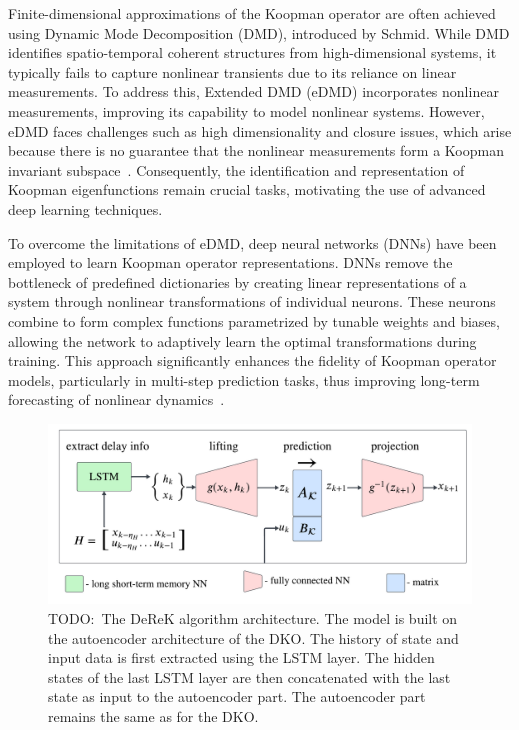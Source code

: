 \documentclass[conference]{IEEEtran}
\newcommand{\todo}[1]{{{\color{red} TODO:~#1	}} }
\begin{document}
Finite-dimensional approximations of the Koopman operator are often achieved using Dynamic Mode Decomposition (DMD), introduced by Schmid. While DMD identifies spatio-temporal coherent structures from high-dimensional systems, it typically fails to capture nonlinear transients due to its reliance on linear measurements. To address this, Extended DMD (eDMD) incorporates nonlinear measurements, improving its capability to model nonlinear systems. However, eDMD faces challenges such as high dimensionality and closure issues, which arise because there is no guarantee that the nonlinear measurements form a Koopman invariant subspace~\cite{Lusch2018}. Consequently, the identification and representation of Koopman eigenfunctions remain crucial tasks, motivating the use of advanced deep learning techniques.

To overcome the limitations of eDMD, deep neural networks (DNNs) have been employed to learn Koopman operator representations. DNNs remove the bottleneck of predefined dictionaries by creating linear representations of a system through nonlinear transformations of individual neurons. These neurons combine to form complex functions parametrized by tunable weights and biases, allowing the network to adaptively learn the optimal transformations during training. This approach significantly enhances the fidelity of Koopman operator models, particularly in multi-step prediction tasks, thus improving long-term forecasting of nonlinear dynamics~\cite{Yeung2019}.
\begin{figure}\label{fig:derek_scheme}
    \centerline{\includegraphics[width = \linewidth]{figures/derek_scheme.pdf}}
    \caption{\todo{The DeReK algorithm architecture. The model is built on the autoencoder architecture of the DKO. The history of state and input data is first extracted using the LSTM layer. The hidden states of the last LSTM layer are then concatenated with the last state as input to the autoencoder part. The autoencoder part remains the same as for the DKO.}}
\end{figure}
\end{document}
